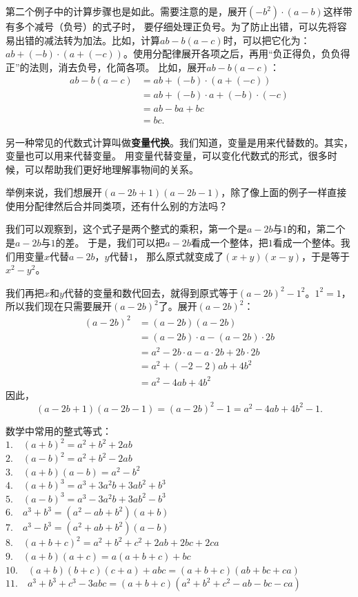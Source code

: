 \documentclass[12pt,UTF8,fontset=none]{ctexbook}
\begin{document}
第二个例子中的计算步骤也是如此。需要注意的是，展开$(- b^2)\cdot (a - b)$这样带有多个减号（负号）的式子时，
要仔细处理正负号。为了防止出错，可以先将容易出错的减法转为加法。比如，计算$ab - b(a-c)$时，可以把它化为：
$ab+(-b)\cdot(a + (-c))$。使用分配律展开各项之后，再用“负正得负，负负得正”的法则，消去负号，化简各项。
比如，展开$ab - b(a-c)$：
\begin{align*}
    ab - b(a-c) &= ab+(-b)\cdot(a + (-c)) \tag{减法化加法}\\
    &= ab + (-b)\cdot a + (-b) \cdot (-c) \tag{分配律展开} \\
    &= ab - ba + bc \tag{消去负号}\\
    &= bc.
\end{align*}

另一种常见的代数式计算叫做\textbf{变量代换}。我们知道，变量是用来代替数的。其实，变量也可以用来代替变量。
用变量代替变量，可以变化代数式的形式，很多时候，可以帮助我们更好地理解事物间的关系。

举例来说，我们想展开$(a - 2b + 1)(a - 2b - 1)$，除了像上面的例子一样直接使用分配律然后合并同类项，还有什么别的方法吗？

我们可以观察到，这个式子是两个整式的乘积，第一个是$a - 2b$与$1$的和，第二个是$a - 2b$与$1$的差。
于是，我们可以把$a - 2b$看成一个整体，把$1$看成一个整体。我们用变量$x$代替$a - 2b$，$y$代替$1$，
那么原式就变成了$(x + y)(x - y)$，于是等于$x^2 - y^2$。

我们再把$x$和$y$代替的变量和数代回去，就得到原式等于$(a - 2b)^2 - 1^2$。$1^2 = 1$，
所以我们现在只需要展开$(a - 2b)^2$了。展开$(a - 2b)^2$：
\begin{align*}
    (a - 2b)^2 &= (a - 2b)(a - 2b)  \\
    &= (a - 2b)\cdot a - (a - 2b) \cdot 2b  \\
    &= a^2 -2b\cdot a -a\cdot 2b + 2b\cdot 2b  \\
    &= a^2 + (-2 -2) ab + 4b^2  \\
    &= a^2 - 4ab + 4b^2 
\end{align*}
因此，
$$ (a - 2b + 1)(a - 2b - 1) = (a - 2b)^2 - 1 = a^2 - 4ab + 4b^2 - 1.$$

数学中常用的整式等式：\\
\indent $1. \quad (a + b)^2 = a^2 + b^2 + 2ab $ \\
\indent $2. \quad (a - b)^2 = a^2 + b^2 - 2ab $ \\
\indent $3. \quad (a + b)(a - b) = a^2 - b^2 $ \\
\indent $4. \quad (a + b)^3 = a^3 + 3a^2b + 3ab^2 + b^3 $ \\
\indent $5. \quad (a - b)^3 = a^3 - 3a^2b + 3ab^2 - b^3 $ \\
\indent $6. \quad a^3 + b^3 = (a^2 - ab + b^2)(a + b) $ \\
\indent $7. \quad a^3 - b^3 = (a^2 + ab + b^2)(a - b) $ \\
\indent $8. \quad (a + b + c)^2 = a^2 + b^2 + c^2 + 2ab + 2bc + 2ca $ \\
\indent $9. \quad (a + b)(a + c) = a(a + b + c) + bc $ \\
\indent $10. \quad (a + b)(b + c)(c + a) + abc = (a + b + c)(ab + bc + ca) $ \\
\indent $11.\quad  a^3+b^3+c^3 - 3abc = (a + b + c)(a^2+b^2+c^2-ab-bc-ca) $ 
\end{document}
